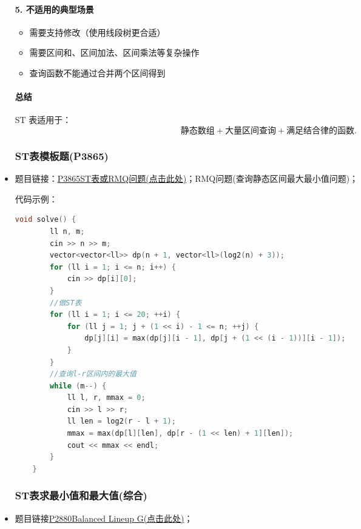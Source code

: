 \begin{itemize}
\paragraph*{5. 不适用的典型场景}
\begin{itemize}
	\item 需要支持修改（使用线段树更合适）
	\item 需要区间和、区间加法、区间乘法等复杂操作
	\item 查询函数不能通过合并两个区间得到
\end{itemize}

\paragraph*{总结}
ST 表适用于：
\[
\text{静态数组} + \text{大量区间查询} + \text{满足结合律的函数}.
\]

\subsubsection{ST表模板题(P3865)}
\item 题目链接：\href{https://www.luogu.com.cn/problem/P3865}{P3865ST表或RMQ问题(点击此处)}；RMQ问题(查询静态区间最大最小值问题)；

代码示例：\\
\begin{lstlisting}[language=C++]
	void solve() {
		ll n, m;
		cin >> n >> m;
		vector<vector<ll>> dp(n + 1, vector<ll>(log2(n) + 3));
		for (ll i = 1; i <= n; i++) {
			cin >> dp[i][0];
		}
		//做ST表
		for (ll i = 1; i <= 20; ++i) {
			for (ll j = 1; j + (1 << i) - 1 <= n; ++j) {
				dp[j][i] = max(dp[j][i - 1], dp[j + (1 << (i - 1))][i - 1]);
			}
		}
		//查询l-r区间内的最大值
		while (m--) {
			ll l, r, mmax = 0;
			cin >> l >> r;
			ll len = log2(r - l + 1);
			mmax = max(dp[l][len], dp[r - (1 << len) + 1][len]);
			cout << mmax << endl;
		}
	}
\end{lstlisting}
\subsubsection{ST表求最小值和最大值(综合)}
\item 题目链接\href{https://www.luogu.com.cn/problem/P2880}{P2880Balanced Lineup G(点击此处)}；


\end{itemize}
